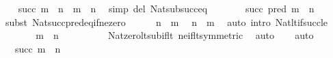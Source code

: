 \begin{isabellebody}
\ \ \isamarkupfalse%
\ {\isachardoublequoteopen}succ\ m\ {\isacharminus}{\kern0pt}\ n\ {\isacharequal}{\kern0pt}\ m\ {\isacharminus}{\kern0pt}\ n{\isacharprime}{\kern0pt}{\isachardoublequoteclose}\ \isamarkupfalse%
\ {\isacharparenleft}{\kern0pt}simp\ del{\isacharcolon}{\kern0pt}\ Nat{\isacharunderscore}{\kern0pt}sub{\isacharunderscore}{\kern0pt}succ{\isacharunderscore}{\kern0pt}eq{\isacharparenright}{\kern0pt}\isanewline
\ \ \isamarkupfalse%
\ \isamarkupfalse%
\ {\isachardoublequoteopen}{\isachardot}{\kern0pt}{\isachardot}{\kern0pt}{\isachardot}{\kern0pt}\ {\isacharequal}{\kern0pt}\ succ\ {\isacharparenleft}{\kern0pt}pred\ {\isacharparenleft}{\kern0pt}m\ {\isacharminus}{\kern0pt}\ n{\isacharprime}{\kern0pt}{\isacharparenright}{\kern0pt}{\isacharparenright}{\kern0pt}{\isachardoublequoteclose}\isanewline
\ \ \isamarkupfalse%
\ {\isacharparenleft}{\kern0pt}subst\ Nat{\isacharunderscore}{\kern0pt}succ{\isacharunderscore}{\kern0pt}pred{\isacharunderscore}{\kern0pt}eq{\isacharunderscore}{\kern0pt}if{\isacharunderscore}{\kern0pt}ne{\isacharunderscore}{\kern0pt}zero{\isacharparenright}{\kern0pt}\isanewline
\ \ \ \ \isamarkupfalse%
\ {\isacartoucheopen}n\ {\isasymle}\ m{\isacartoucheclose}\ \isamarkupfalse%
\ {\isachardoublequoteopen}n{\isacharprime}{\kern0pt}\ {\isacharless}{\kern0pt}\ m{\isachardoublequoteclose}\ \isamarkupfalse%
\ {\isacharparenleft}{\kern0pt}auto\ intro{\isacharcolon}{\kern0pt}\ Nat{\isacharunderscore}{\kern0pt}lt{\isacharunderscore}{\kern0pt}if{\isacharunderscore}{\kern0pt}succ{\isacharunderscore}{\kern0pt}le{\isacharparenright}{\kern0pt}\isanewline
\ \ \ \ \isamarkupfalse%
\ \isamarkupfalse%
\ {\isachardoublequoteopen}m\ {\isacharminus}{\kern0pt}\ n{\isacharprime}{\kern0pt}\ {\isasymnoteq}\ {}{\isachardoublequoteclose}\isanewline
\ \ \ \ \ \ \isamarkupfalse%
\ Nat{\isacharunderscore}{\kern0pt}zero{\isacharunderscore}{\kern0pt}lt{\isacharunderscore}{\kern0pt}sub{\isacharunderscore}{\kern0pt}if{\isacharunderscore}{\kern0pt}lt\ ne{\isacharunderscore}{\kern0pt}if{\isacharunderscore}{\kern0pt}lt{\isacharbrackleft}{\kern0pt}symmetric{\isacharbrackright}{\kern0pt}\ \isamarkupfalse%
\ auto\isanewline
\ \ \isamarkupfalse%
\ auto\isanewline
\ \ \isamarkupfalse%
\ \isamarkupfalse%
\ {\isachardoublequoteopen}{\isachardot}{\kern0pt}{\isachardot}{\kern0pt}{\isachardot}{\kern0pt}\ {\isacharequal}{\kern0pt}\ succ\ {\isacharparenleft}{\kern0pt}m\ {\isacharminus}{\kern0pt}\ n{\isacharparenright}{\kern0pt}{\isachardoublequoteclose}\ \isamarkupfalse%

\end{isabellebody}
